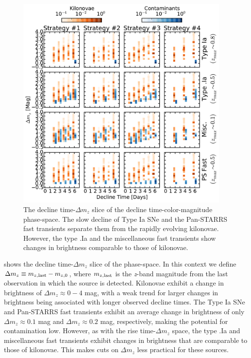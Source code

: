 \begin{figure}[t!]
\centering
\includegraphics[width=0.95\textwidth]{./figs/chapter2/ch2_f11.pdf}
\caption{The decline time-$\Delta m_z$ slice of the decline time-color-magnitude phase-space. The slow decline of Type Ia SNe and the Pan-STARRS fast transients separate them from the rapidly evolving kilonovae. However, the type .Ia and the miscellaneous fast transients show changes in brightness comparable to those of kilonovae.}
\label{fig:ch2_decdm}
\end{figure}

 shows the decline time-$\Delta m_z$ slice of the phase-space. In this context we define $\Delta m_z \equiv m_{z,{\rm last}} - m_{z,{\rm 0}}$, where $m_{z,{\rm last}}$ is the {\em z}-band magnitude from the last observation in which the source is detected. Kilonovae exhibit a change in brightness of $\Delta m_z \approx 0 - 4$ mag, with a weak trend for larger changes in brightness being associated with longer observed decline times. The Type Ia SNe and Pan-STARRS fast transients exhibit an average change in brightness of only $\Delta m_z \approx 0.1$ mag and $\Delta m_z \approx 0.2$ mag, respectively, making the potential for contamination low. However, as with the rise time-$\Delta m_z$ space, the type .Ia and miscellaneous fast transients exhibit changes in brightness that are comparable to those of kilonovae. This makes cuts on $\Delta m_z$ less practical for these sources.

